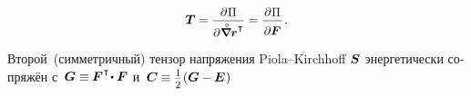 \begin{otherlanguage}{russian}
\nopagebreak\vspace{-0.12em}\begin{equation}
\firstpiolakirchhoffstress \hspace{-0.1ex}
= \scalebox{0.92}{$ \displaystyle \frac{\partial \hspace{.1ex} \potentialenergydensity}{\raisemath{-0.4em}{\partial \hspace{.1ex} \smash{\boldnablacircled} \currentlocationvector^{\hspace{.1ex}\T}}} $}
= \scalebox{0.92}{$ \displaystyle \frac{\hspace{.2ex} \partial \hspace{.1ex} \potentialenergydensity \hspace{.2ex}}{\raisemath{-0.25em}{\partial \bm{F}}} $} \hspace{.25ex}.
\vspace{.1em}\end{equation}

Второй~(симметричный) тензор напряжения Piola--Kirch\-hoff $\bm{S}$ энергетически сопряжён с~${\bm{G} \equiv \hspace{-0.1ex} \bm{F}^{\hspace{.1ex}\T} \hspace{-0.36ex} \dotp \bm{F}}$ и~${\bm{C} \hspace{-0.1ex} \equiv \smalldisplaystyleonehalf \hspace{.1ex} (\bm{G} - \hspace{-0.12ex} \UnitDyad \hspace{.1ex})}$


\end{otherlanguage}
